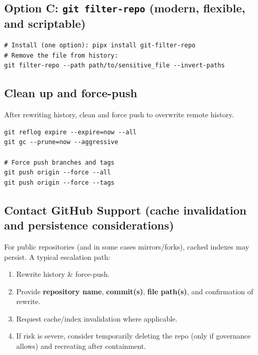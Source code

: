 \documentclass[11pt]{article}
\begin{document}
\subsection{Option C: \texttt{git filter-repo} (modern, flexible, and scriptable)}
\begin{examplebox}[title={Example: remove a file from all history using \texttt{git filter-repo}}]
\begin{verbatim}
# Install (one option): pipx install git-filter-repo
# Remove the file from history:
git filter-repo --path path/to/sensitive_file --invert-paths
\end{verbatim}
\end{examplebox}

\subsection{Clean up and force-push}
After rewriting history, clean and force push to overwrite remote history.

\begin{examplebox}[title={Cleanup and force push}]
\begin{verbatim}
git reflog expire --expire=now --all
git gc --prune=now --aggressive

# Force push branches and tags
git push origin --force --all
git push origin --force --tags
\end{verbatim}
\end{examplebox}

\subsection{Contact GitHub Support (cache invalidation and persistence considerations)}
For public repositories (and in some cases mirrors/forks), cached indexes may persist. A typical escalation path:

\begin{enumerate}[leftmargin=*,itemsep=2pt]
  \item Rewrite history \& force-push.
  \item Provide \textbf{repository name}, \textbf{commit(s)}, \textbf{file path(s)}, and confirmation of rewrite.
  \item Request cache/index invalidation where applicable.
  \item If risk is severe, consider temporarily deleting the repo (only if governance allows) and recreating after containment.
\end{enumerate}
\end{document}
